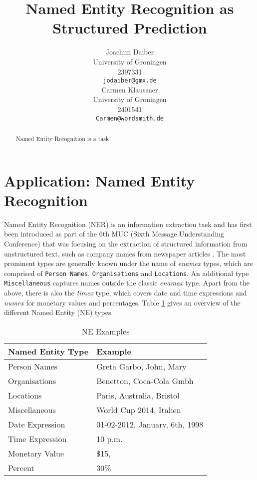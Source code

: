\documentclass[11pt]{article}
\title{Named Entity Recognition as Structured Prediction}
\author{Joachim Daiber \\
  University of Groningen \\
  2397331\\
  {\tt jodaiber@gmx.de} \\\And
  Carmen Klaussner \\
  University of Groningen \\
  2401541\\
  {\tt Carmen@wordsmith.de} \\}
\date{}
\begin{document}
\maketitle

\begin{abstract}
Named Entity Recognition is a task

\end{abstract}


\section{Application: Named Entity Recognition}

Named Entity Recognition (NER) is an information extraction task and has first been introduced as part of the 6th MUC (Sixth Message Understanding Conference)
that was focusing on the extraction of structured information from unstructured text, such as company names from newspaper articles \cite{nadeau2007survey}.
The most prominent types are generally known under the name of \emph{enamex} types, which are comprised of \texttt{Person Names}, 
\texttt{Organisations} and \texttt{Locations}. 
An additional type \texttt{Miscellaneous} captures names outside the classic \emph{enamax} type.
Apart from the above, there is also the \emph{timex} type, which covers date and time expressions and \emph{numex} for monetary values and percentages. 
Table \ref{table:NETypes} gives an overview of the different Named Entity (NE) types.

\begin{table}[h!]
\scriptsize
\begin{tabular}{| l | l |}
\hline
\bf Named Entity Type & \bf Example \\
\hline
Person Names & Greta Garbo, John, Mary \\
Organisations& Benetton, Coca-Cola Gmbh\\
Locations&  Paris, Australia, Bristol\\
Miscellaneous& World Cup 2014, Italien\\
 Date Expression& 01-02-2012, January, 6th, 1998 \\
Time Expression & 10 p.m.\\
Monetary Value &  \$15, \textsterling 100    \\
Percent &   30\% \\
\hline
\end{tabular}
\caption{NE Examples}
\label{table:NETypes}
\end{table}
\end{document}
